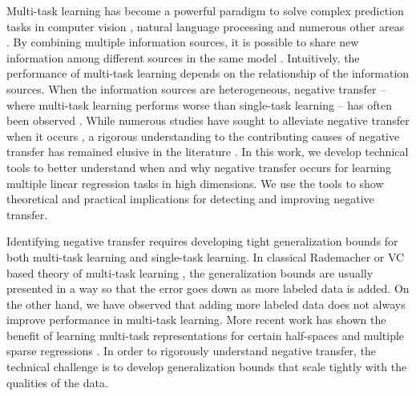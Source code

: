 Multi-task learning has become a powerful paradigm to solve complex prediction tasks in computer vision \cite{chexnet17,ZSSGM18}, natural language processing \cite{GLUE,superglue} and numerous other areas \cite{ZY17}.
By combining multiple information sources, it is possible to share new information among different sources in the same model \cite{C97}.
Intuitively, the performance of multi-task learning depends on the relationship of the information sources.
When the information sources are heterogeneous, negative transfer -- where multi-task learning performs worse than single-task learning -- has often been observed \cite{AP16,BS17}.
While numerous studies have sought to alleviate negative transfer when it occurs \cite{ZY17}, a rigorous understanding to the contributing causes of negative transfer has remained elusive in the literature \cite{R17}.
In this work, we develop technical tools to better understand when and why negative transfer occurs for learning multiple linear regression tasks in high dimensions. %
We use the tools to show theoretical and practical implications for detecting and improving negative transfer.

Identifying negative transfer requires developing tight generalization bounds for both multi-task learning and single-task learning.
In classical Rademacher or VC based theory of multi-task learning \cite{B00,AZ05,M06}, the generalization bounds are usually presented in a way so that the error goes down as more labeled data is added.
On the other hand, we have observed that adding more labeled data does not always improve performance in multi-task learning.
More recent work has shown the benefit of learning multi-task representations for certain half-spaces \cite{MPR16} and multiple sparse regressions \cite{LPTV09,LPVT11}.
In order to rigorously understand negative transfer, the technical challenge is to develop generalization bounds that scale tightly with the qualities of the data.

